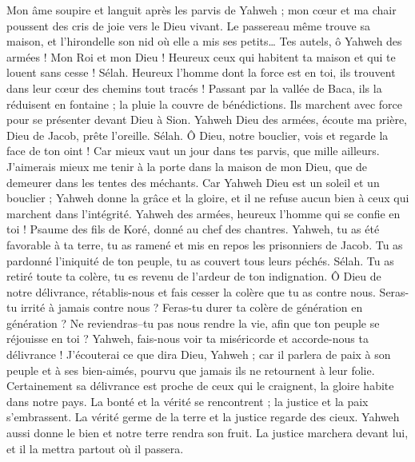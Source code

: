 \begin{multicols}{2}
Mon âme soupire et languit après les parvis de Yahweh ; mon cœur et ma chair poussent des cris de joie vers le Dieu vivant.
Le passereau même trouve sa maison, et l'hirondelle son nid où elle a mis ses petits… Tes autels, ô Yahweh des armées ! Mon Roi et mon Dieu !
Heureux ceux qui habitent ta maison et qui te louent sans cesse ! Sélah.
Heureux l'homme dont la force est en toi, ils trouvent dans leur cœur des chemins tout tracés !
Passant par la vallée de Baca, ils la réduisent en fontaine ; la pluie la couvre de bénédictions.
Ils marchent avec force pour se présenter devant Dieu à Sion.
Yahweh Dieu des armées, écoute ma prière, Dieu de Jacob, prête l'oreille. Sélah.
Ô Dieu, notre bouclier, vois et regarde la face de ton oint !
Car mieux vaut un jour dans tes parvis, que mille ailleurs. J'aimerais mieux me tenir à la porte dans la maison de mon Dieu, que de demeurer dans les tentes des méchants.
Car Yahweh Dieu est un soleil et un bouclier ; Yahweh donne la grâce et la gloire, et il ne refuse aucun bien à ceux qui marchent dans l'intégrité.
Yahweh des armées, heureux l'homme qui se confie en toi !
\VerseOne{}Psaume des fils de Koré, donné au chef des chantres.
Yahweh, tu as été favorable à ta terre, tu as ramené et mis en repos les prisonniers de Jacob.
Tu as pardonné l'iniquité de ton peuple, tu as couvert tous leurs péchés. Sélah.
Tu as retiré toute ta colère, tu es revenu de l'ardeur de ton indignation.
Ô Dieu de notre délivrance, rétablis-nous et fais cesser la colère que tu as contre nous.
Seras-tu irrité à jamais contre nous ? Feras-tu durer ta colère de génération en génération ?
Ne reviendras–tu pas nous rendre la vie, afin que ton peuple se réjouisse en toi ?
Yahweh, fais-nous voir ta miséricorde et accorde-nous ta délivrance !
J'écouterai ce que dira Dieu, Yahweh ; car il parlera de paix à son peuple et à ses bien-aimés, pourvu que jamais ils ne retournent à leur folie.
Certainement sa délivrance est proche de ceux qui le craignent, la gloire habite dans notre pays.
La bonté et la vérité se rencontrent ; la justice et la paix s'embrassent.
La vérité germe de la terre et la justice regarde des cieux.
Yahweh aussi donne le bien et notre terre rendra son fruit.
La justice marchera devant lui, et il la mettra partout où il passera.

\end{multicols}
